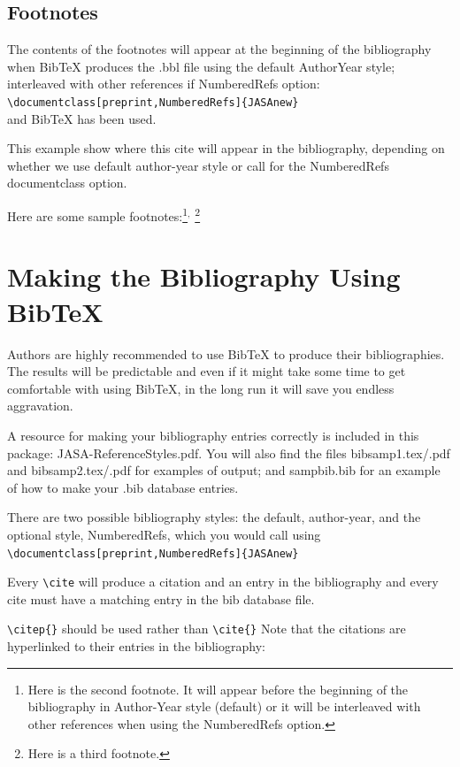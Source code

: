 \documentclass[reprint,NumberedRefs]{JASAnew}
\begin{document}
\subsection{Footnotes}
The contents of the footnotes will appear at the beginning of the
bibliography when BibTeX produces the .bbl file using the default
AuthorYear style; interleaved with other references if 
Numbered\-Refs option:\\
\verb+\documentclass[preprint,NumberedRefs]{JASAnew}+\\
and BibTeX has been used.

This example show where this cite \citep{booksamp1} will appear in the
bibliography,
depending on whether we use default author-year style
or call for the NumberedRefs documentclass option.

Here are some sample footnotes:\footnote{Here is the second footnote.
It will appear before the beginning of the bibliography in Author-Year
style (default) or it will be 
 interleaved with other references when using the Numbered\-Refs
 option.}$^,$%
\footnote{Here is a third footnote.}


\section{Making the Bibliography Using BibTeX}
Authors are highly  recommended to use BibTeX to produce their
bibliographies. The results will be predictable and even if
it might take some time to get comfortable with  using BibTeX,
in the long run it will save you endless aggravation.

A resource for making your bibliography entries
correctly is included in this package: 
JASA-ReferenceStyles.pdf. You will also find
the files
bibsamp1.tex/.pdf and bibsamp2.tex/.pdf
for examples of output; and sampbib.bib for an example of
how to make your .bib database entries.

There are two possible bibliography styles: the default, author-year,
and the optional style, Numbered\-Refs, which you would call using\\
{\verb+\documentclass[preprint,NumberedRefs]{JASAnew}+ }

Every \verb+\cite+ will produce a citation and an entry in the
bibliography and every cite must have a matching entry in the bib
database file.

\verb+\citep{}+ should be used rather than \verb+\cite{}+
Note that the citations are hyperlinked to their entries in the
bibliography:
\end{document}
